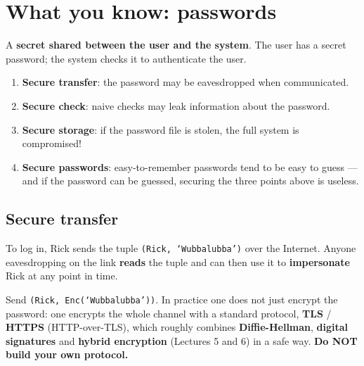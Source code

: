 \section{What you know: passwords}

\begin{defnbox}[title=Password]
A \textbf{secret shared between the user and the system}. The user has a secret password; the
system checks it to authenticate the user.
\end{defnbox}

\begin{keybox}[title=The four problems to be solved]
\begin{enumerate}
  \item \textbf{Secure transfer}: the password may be eavesdropped when communicated.
  \item \textbf{Secure check}: naive checks may leak information about the password.
  \item \textbf{Secure storage}: if the password file is stolen, the full system is compromised!
  \item \textbf{Secure passwords}: easy-to-remember passwords tend to be easy to guess --- and
        if the password can be guessed, securing the three points above is useless.
\end{enumerate}
\end{keybox}

\subsection{Secure transfer}

\begin{defnbox}[title=Sending the password in the clear]
To log in, Rick sends the tuple \texttt{(Rick, `Wubbalubba')} over the Internet. Anyone
eavesdropping on the link \textbf{reads} the tuple and can then use it to \textbf{impersonate}
Rick at any point in time.
\end{defnbox}

\begin{propbox}[title=Encrypt the channel]
Send \texttt{(Rick, Enc(`Wubbalubba'))}. In practice one does not just encrypt the password: one
encrypts the whole channel with a standard protocol, \textbf{TLS} / \textbf{HTTPS}
(HTTP-over-TLS), which roughly combines \textbf{Diffie-Hellman}, \textbf{digital signatures} and
\textbf{hybrid encryption} (Lectures 5 and 6) in a safe way. \textbf{Do NOT build your own
protocol.}
\end{propbox}

